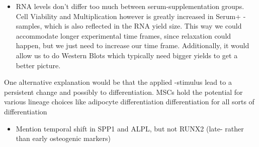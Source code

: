 \begin{itemize}
\item RNA levels don't differ too much between serum-supplementation groups. Cell Viability and Multiplication however is greatly increased in Serum+ - samples, which is also reflected in the RNA yield size. This way we could accommodate longer experimental time frames, since relaxation could happen, but we just need to increase our time frame. Additionally, it would allow us to do Western Blots which typically need bigger yields to get a better picture. 
\end{itemize}

One alternative explanation would be that the applied \Yoda{}-stimulus lead to a persistent change and possibly to differentiation. MSCs hold the potential for various lineage choices like adipocyte differentiation differentiation for all sorts of differentiation

\begin{itemize}
\item Mention temporal shift in SPP1 and ALPL, but not RUNX2 (late- rather than early osteogenic markers)
\end{itemize}

